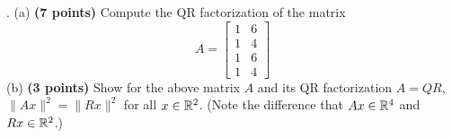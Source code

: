 \documentclass[12pt,a4paper]{article}
\renewcommand{\l}{\left}
\renewcommand{\r}{\right}
\def\R{\ifmmode\mathbb R\fi}
\begin{document}
\newpage
{}. (a) \textbf{(7 points)} Compute the QR factorization of the matrix 
$$A = \l[
\begin{array}{cc}
    1 & 6\\
    1 & 4\\
    1 & 6\\
    1 & 4
\end{array}
\r]$$
(b) \textbf{(3 points)} Show for the above matrix $A$ and its QR factorization $A = QR$, $\|Ax\|^2 = \|Rx\|^2$ for all $x \in \R^2$. (Note the difference that $Ax \in \R^4$ and $Rx \in \R^2$.) \\
\\
\end{document}
